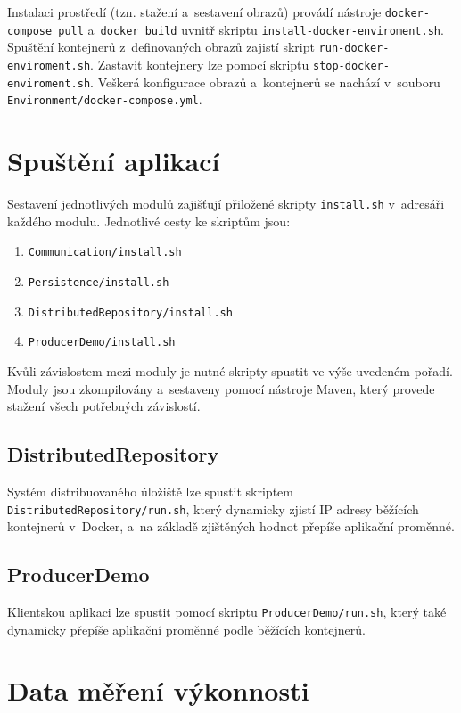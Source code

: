 Instalaci prostředí (tzn. stažení a~sestavení obrazů) provádí nástroje \texttt{docker-compose pull} a~\texttt{docker build} uvnitř skriptu \texttt{install-docker-enviroment.sh}. Spuštění kontejnerů z~definovaných obrazů zajistí skript \texttt{run-docker-enviroment.sh}. Zastavit kontejnery lze pomocí skriptu \texttt{stop-docker-enviroment.sh}. Veškerá konfigurace obrazů a~kontejnerů se nachází v~souboru \texttt{Environment/docker-compose.yml}.

\chapter{Spuštění aplikací} \label{launching}
Sestavení jednotlivých modulů zajišťují přiložené skripty \texttt{install.sh} v~adresáři každého modulu. Jednotlivé cesty ke skriptům jsou:

\begin{enumerate}
    \item \texttt{Communication/install.sh}
    
    \item \texttt{Persistence/install.sh}
    
    \item \texttt{DistributedRepository/install.sh}
    
    \item \texttt{ProducerDemo/install.sh}
\end{enumerate}

\noindent Kvůli závislostem mezi moduly je nutné skripty spustit ve výše uvedeném pořadí. Moduly jsou zkompilovány a~sestaveny pomocí nástroje Maven, který provede stažení všech potřebných závislostí.

\section{DistributedRepository}
Systém distribuovaného úložiště lze spustit skriptem \texttt{DistributedRepository/run.sh}, který dynamicky zjistí IP adresy běžících kontejnerů v~Docker, a~na základě zjištěných hodnot přepíše aplikační proměnné.

\section{ProducerDemo}
Klientskou aplikaci lze spustit pomocí skriptu \texttt{ProducerDemo/run.sh}, který také dynamicky přepíše aplikační proměnné podle běžících kontejnerů.

\chapter{Data měření výkonnosti}

